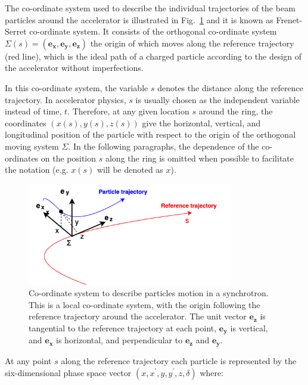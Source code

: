 The co-ordinate system used to describe the individual trajectories of the beam particles around the accelerator is illustrated in Fig.~\ref{fig:coordinate_system} and it is known as Frenet-Serret co-ordinate system.  It consists of the orthogonal co-ordinate system $\Sigma(s) = (\mathbf{e_x}, \mathbf{e_y}, \mathbf{e_z})$ the origin of which moves along the reference trajectory (red line), which is the ideal path of a charged particle according to the design of the accelerator without imperfections.

In this co-ordinate system, the variable $s$ denotes the distance along the reference trajectory. In accelerator physics, $s$ is usually chosen as the independent variable instead of time, $t$.  %
Therefore, at any given location $s$ around the ring, the coordinates $(x(s), y(s), z(s))$ give the horizontal, vertical, and longitudinal position of the particle with respect to the origin of the orthogonal moving system $\Sigma$. In the following paragraphs, the dependence of the co-ordinates on the position $s$ along the ring is omitted when possible to facilitate the notation (e.g. $x(s)$ will be denoted as $x$).

\begin{figure}[!h] %
    \centering         
    \includegraphics[width=0.8\textwidth]{images/Ch2/coordinates_particle_motion.png}
        \caption{Co-ordinate system to describe particles motion in a synchrotron. This is a local co-ordinate system, with the origin following the reference trajectory around the accelerator.  The unit vector $\mathbf{e_z}$ is tangential to the reference trajectory at each point, $\mathbf{e_y}$ is vertical, and $\mathbf{e_x}$ is horizontal, and perpendicular to $\mathbf{e_z}$ and $\mathbf{e_y}$.}
        \label{fig:coordinate_system}
 \end{figure}


 At any point $s$ along the reference trajectory each particle is represented by the six-dimensional phase space vector $(x, x^{\prime}, y, y^{\prime}, z, \delta)$ where:

